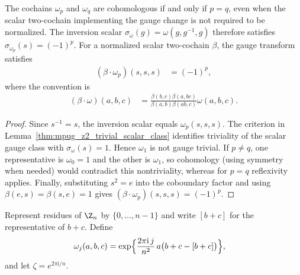 \begin{lemma}
    \label{thm:asymex_z2_classes}
    \leanok
    The cochains $\omega_p$ and $\omega_q$ are cohomologous if and
    only if $p=q$, even when the scalar two-cochain implementing the
    gauge change is not required to be normalized.
    The inversion scalar $\sigma_\omega(g)=\omega(g,g^{-1},g)$
    therefore satisfies $\sigma_{\omega_p}(s)=(-1)^p$.
    For a normalized scalar two-cochain $\beta$, the gauge
    transform satisfies
    \begin{align}
        (\beta\cdot\omega_p)(s,s,s) & =(-1)^p,
    \end{align}
    where the convention is
    \begin{align}
        (\beta\cdot\omega)(a,b,c)
         & =\frac{\beta(b,c)\beta(a,bc)}
            {\beta(a,b)\beta(ab,c)}\omega(a,b,c).
    \end{align}
\end{lemma}
\begin{proof}
    \leanok
    Since $s^{-1}=s$, the inversion scalar equals
    $\omega_p(s,s,s)$. The criterion in Lemma~\ref{thm:mpug_z2_trivial_scalar_class}
    identifies triviality of the scalar gauge
    class with $\sigma_\omega(s)=1$. Hence $\omega_1$ is not
    gauge trivial. If $p\neq q$, one representative is $\omega_0=1$
    and the other is $\omega_1$, so cohomology (using symmetry when
    needed) would contradict this nontriviality, whereas for $p=q$
    reflexivity applies. Finally, substituting $s^2=e$ into the
    coboundary factor and using $\beta(e,s)=\beta(s,e)=1$
    gives $(\beta\cdot\omega_p)(s,s,s)=(-1)^p$.
\end{proof}

\begin{definition}
    \label{def:asymex_group_cocycle_cyclic}
    \leanok
    Represent residues of $\Z_n$ by $\{0,\ldots,n-1\}$ and write
    $[b+c]$ for the representative of $b+c$. Define
    \begin{align}
        \omega_j(a,b,c)
         & =\exp\Bigl\{\frac{2\pi\mathrm{i}\,j}{n^2}\,a\bigl(b+c-[b+c]\bigr)\Bigr\},
        \notag
    \end{align}
    and let $\zeta=e^{2\pi\mathrm{i}/n}$.
\end{definition}

